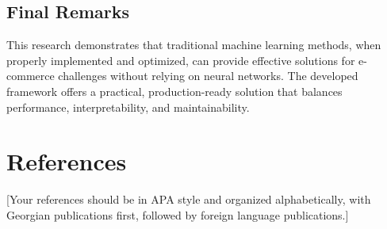 \documentclass[12pt]{article}
\begin{document}
\subsection{Final Remarks}
This research demonstrates that traditional machine learning methods, when properly implemented and optimized, can provide effective solutions for e-commerce challenges without relying on neural networks. The developed framework offers a practical, production-ready solution that balances performance, interpretability, and maintainability.

\section{References}
[Your references should be in APA style and organized alphabetically, with Georgian publications first, followed by foreign language publications.]

% 
% 
\end{document}
